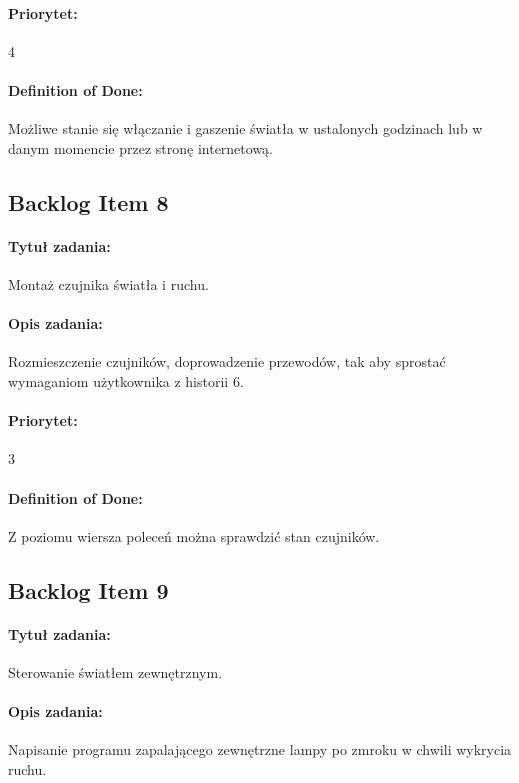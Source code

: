 	\paragraph{Priorytet:}
	4
	
	\paragraph{Definition of Done:}
	Możliwe stanie się włączanie i gaszenie światła w ustalonych godzinach lub w danym momencie przez stronę internetową.


	\subsection{Backlog Item 8}
	\paragraph{Tytuł zadania:}
	Montaż czujnika światła i ruchu.
	
	\paragraph{Opis zadania:} 
	Rozmieszczenie czujników, doprowadzenie przewodów, tak aby sprostać wymaganiom użytkownika z historii 6. 
	
	\paragraph{Priorytet:}
	3
	
	\paragraph{Definition of Done:}
	Z poziomu wiersza poleceń można sprawdzić stan czujników.
	


	\subsection{Backlog Item 9}
	\paragraph{Tytuł zadania:}
	Sterowanie światłem zewnętrznym.
	
	\paragraph{Opis zadania:} 
	Napisanie programu zapalającego zewnętrzne lampy po zmroku w chwili wykrycia ruchu. 
	
